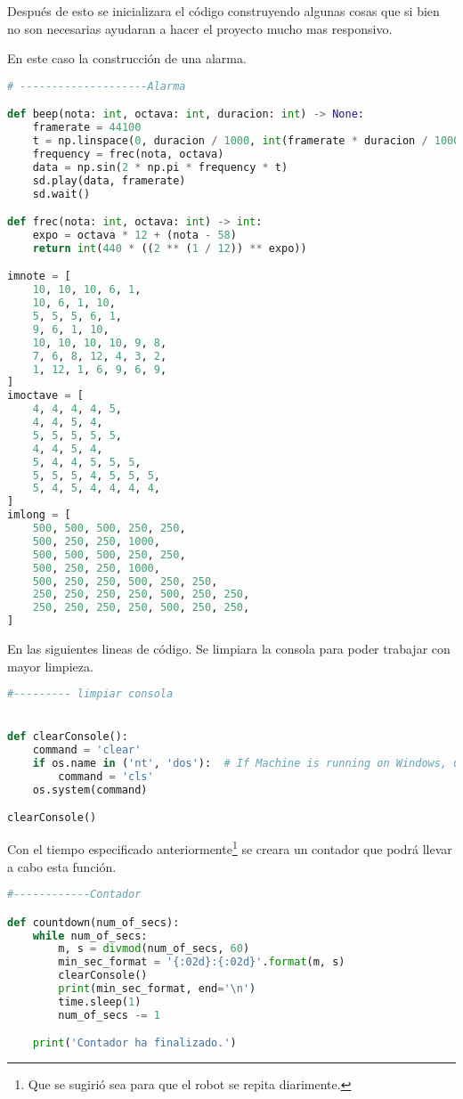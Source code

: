 \documentclass[letterpaper,12pt,oneside]{book}
\begin{document}
Después de esto se inicializara el código construyendo algunas cosas que si bien no son necesarias ayudaran a hacer el proyecto mucho mas responsivo.

En este caso la construcción de una alarma.


\begin{lstlisting}[language=Python]
# --------------------Alarma

def beep(nota: int, octava: int, duracion: int) -> None:
    framerate = 44100
    t = np.linspace(0, duracion / 1000, int(framerate * duracion / 1000))
    frequency = frec(nota, octava)
    data = np.sin(2 * np.pi * frequency * t)
    sd.play(data, framerate)
    sd.wait()

def frec(nota: int, octava: int) -> int:
    expo = octava * 12 + (nota - 58)
    return int(440 * ((2 ** (1 / 12)) ** expo))

imnote = [
    10, 10, 10, 6, 1,
    10, 6, 1, 10,
    5, 5, 5, 6, 1,
    9, 6, 1, 10,
    10, 10, 10, 10, 9, 8,
    7, 6, 8, 12, 4, 3, 2,
    1, 12, 1, 6, 9, 6, 9,
]
imoctave = [
    4, 4, 4, 4, 5,
    4, 4, 5, 4,
    5, 5, 5, 5, 5,
    4, 4, 5, 4,
    5, 4, 4, 5, 5, 5,
    5, 5, 5, 4, 5, 5, 5,
    5, 4, 5, 4, 4, 4, 4,
]
imlong = [
    500, 500, 500, 250, 250,
    500, 250, 250, 1000,
    500, 500, 500, 250, 250,
    500, 250, 250, 1000,
    500, 250, 250, 500, 250, 250,
    250, 250, 250, 250, 500, 250, 250,
    250, 250, 250, 250, 500, 250, 250,
]
\end{lstlisting}
En las siguientes lineas de código.
Se limpiara la consola para poder trabajar con mayor limpieza.

\begin{lstlisting}[language=Python]
#--------- limpiar consola


def clearConsole():
    command = 'clear'
    if os.name in ('nt', 'dos'):  # If Machine is running on Windows, use cls
        command = 'cls'
    os.system(command)

clearConsole()
\end{lstlisting}

Con el tiempo especificado anteriormente\footnote{Que se sugirió sea para que el robot se repita diarimente.} se creara un contador que podrá llevar a cabo esta función.

\begin{lstlisting}[language=Python]
#------------Contador

def countdown(num_of_secs):
    while num_of_secs:
        m, s = divmod(num_of_secs, 60)
        min_sec_format = '{:02d}:{:02d}'.format(m, s)
        clearConsole()
        print(min_sec_format, end='\n')
        time.sleep(1)
        num_of_secs -= 1

    print('Contador ha finalizado.')
\end{lstlisting}
\end{document}
